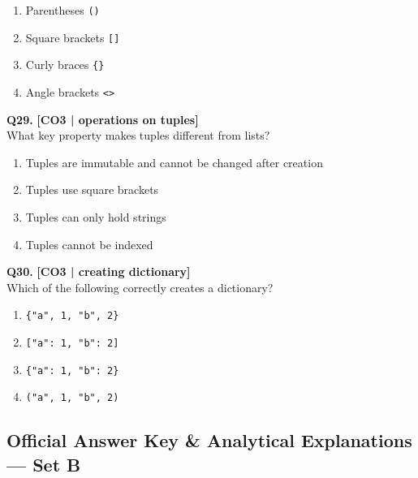 \begin{enumerate}[label=(\alph*),topsep=2pt,itemsep=1pt,partopsep=0pt,parsep=0pt]
    \item \relax Parentheses \texttt{()}
    \item \relax Square brackets \texttt{[]}
    \item \relax Curly braces \texttt{\{\}}
    \item \relax Angle brackets \texttt{<>}
\end{enumerate}
\vspace{{2mm}}

\noindent\textbf{Q29.} \hfill {\small\color{LPUOrange}\textbf{[CO3 | operations on tuples]}}\\[2pt]
What key property makes tuples different from lists?

\begin{enumerate}[label=(\alph*),topsep=2pt,itemsep=1pt,partopsep=0pt,parsep=0pt]
    \item \relax Tuples are immutable and cannot be changed after creation
    \item \relax Tuples use square brackets
    \item \relax Tuples can only hold strings
    \item \relax Tuples cannot be indexed
\end{enumerate}
\vspace{{2mm}}

\noindent\textbf{Q30.} \hfill {\small\color{LPUOrange}\textbf{[CO3 | creating dictionary]}}\\[2pt]
Which of the following correctly creates a dictionary?

\begin{enumerate}[label=(\alph*),topsep=2pt,itemsep=1pt,partopsep=0pt,parsep=0pt]
    \item \relax \texttt{\{"a", 1, "b", 2\}}
    \item \relax \texttt{["a": 1, "b": 2]}
    \item \relax \texttt{\{"a": 1, "b": 2\}}
    \item \relax \texttt{("a", 1, "b", 2)}
\end{enumerate}
\vspace{{2mm}}

\newpage
\subsection*{Official Answer Key \& Analytical Explanations --- Set B}

